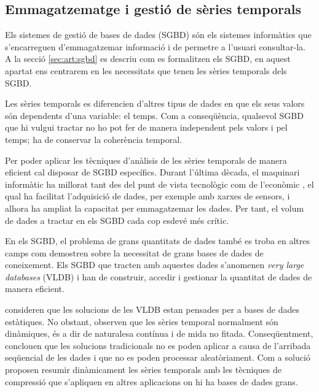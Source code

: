 \subsection{Emmagatzematge i gestió de sèries temporals}


Els sistemes de gestió de bases de dades (SGBD) són els sistemes informàtics que s'encarreguen d'emmagatzemar informació i de permetre a l'usuari consultar-la. A la secció \ref{sec:art:sgbd} es descriu com es formalitzen els SGBD, en aquest apartat ens centrarem en les necessitats que tenen les sèries temporals dels SGBD.


Les sèries temporals es diferencien d'altres tipus de dades en que els seus valors són dependents d'una variable: el temps. Com a conseqüència, qualsevol SGBD que hi vulgui tractar no ho pot fer de manera independent pels valors i pel temps; ha de conservar la coherència temporal.

Per poder aplicar les tècniques d'anàlisis de les sèries temporals de manera eficient cal disposar de SGBD específics. 
Durant l'última dècada, el maquinari informàtic ha millorat tant des del punt de vista tecnològic com de l'econòmic \parencite{deligiannakis07}, el qual ha facilitat l'adquisició de dades, per exemple amb xarxes de sensors, i alhora ha ampliat la capacitat per emmagatzemar les dades. 
Per tant, el volum de dades a tractar  en els SGBD cada cop esdevé més crític.

 
En els SGBD, el problema de grans quantitats de dades també es troba en altres camps com demostren \textcite{mylopoulos96} sobre la necessitat de grans bases de dades de coneixement. Els SGBD que tracten amb aquestes dades s'anomenen \emph{very large databases} (VLDB) i han de construir, accedir i gestionar la quantitat de dades de manera eficient.

\textcite{ogras06}  consideren que les solucions de les VLDB estan pensades per a bases de dades estàtiques. No obstant, observen que les sèries temporal normalment són dinàmiques, és a dir de naturalesa contínua i de mida no fitada. Conseqüentment, conclouen que les solucions tradicionals no es poden aplicar a causa de l'arribada seqüencial de les dades i que no es poden processar aleatòriament. 
Com a solució proposen resumir dinàmicament les sèries temporals amb les tècniques de compressió que s'apliquen en altres aplicacions on hi ha bases de dades grans.


